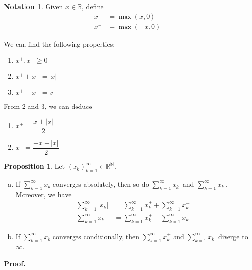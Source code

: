 \documentclass[11pt]{article}
\theoremstyle{definition}
\newtheorem{prop}[thm]{Proposition}
\newtheorem{notation}[thm]{Notation}
\newcommand{\mbN}{\ensuremath{\mathbb{N}}}
\newcommand{\mbR}{\ensuremath{\mathbb{R}}}
\begin{document}
\begin{notation}
Given $x \in \mbR$, define
\begin{align*}
x^+ & = \max(x, 0) \\
x^- & = \max(-x, 0)
\end{align*}
\end{notation}

We can find the following properties:
\begin{enumerate}
\item $x^+, x^- \geq 0$
\item $x^+ + x^- = |x|$
\item $x^+ - x^- = x$
\end{enumerate}
From 2 and 3, we can deduce
\begin{enumerate}[resume]
\item $x^+ = \dfrac{x+|x|}2$
\item $x^- = \dfrac{-x+|x|}2$
\end{enumerate}

\begin{prop}
Let $(x_k)_{k=1}^\infty \in \mbR^\mbN$.

\begin{enumerate}[(a)] \vspace{-0.2cm}

\item If $\sum_{k=1}^\infty x_k$ converges absolutely, then so do $\sum_{k=1}^\infty x_k^+$ and $\sum_{k=1}^\infty x_k^-$. Moreover, we have
\begin{align*}
\sum_{k=1}^\infty |x_k| & = \sum_{k=1}^\infty x_k^+ + \sum_{k=1}^\infty x_k^- \\
\sum_{k=1}^\infty x_k & = \sum_{k=1}^\infty x_k^+ - \sum_{k=1}^\infty x_k^-
\end{align*}

\item If $\sum_{k=1}^\infty x_k$ converges conditionally, then $\sum_{k=1}^\infty x_k^+$ and $\sum_{k=1}^\infty x_k^-$ diverge to $\infty$.

\end{enumerate}
\end{prop}
\textbf{Proof.} 
\end{document}
